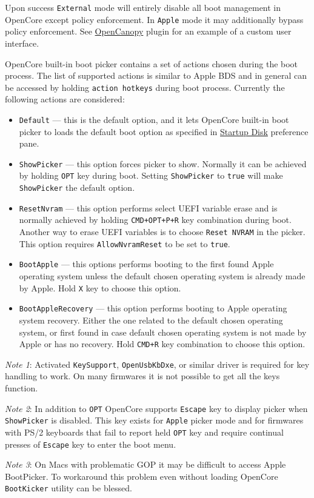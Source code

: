 \documentclass[]{article}
\providecommand{\tightlist}{%
  \setlength{\itemsep}{0pt}\setlength{\parskip}{0pt}}
\begin{document}
\begin{enumerate}
  Upon success \texttt{External} mode will entirely disable all boot management
  in OpenCore except policy enforcement. In \texttt{Apple} mode it may additionally
  bypass policy enforcement. See \hyperref[ueficanopy]{OpenCanopy} plugin
  for an example of a custom user interface.

  OpenCore built-in boot picker contains a set of actions chosen during the boot process.
  The list of supported actions is similar to Apple BDS and in general can be accessed by
  holding \texttt{action hotkeys} during boot process. Currently the following actions are
  considered:

  \begin{itemize}
  \tightlist
  \item \texttt{Default} --- this is the default option, and it lets OpenCore built-in
  boot picker to loads the default boot option as specified in
  \href{https://support.apple.com/HT202796}{Startup Disk} preference pane.
  \item \texttt{ShowPicker} --- this option forces picker to show. Normally it can be
  achieved by holding \texttt{OPT} key during boot. Setting \texttt{ShowPicker} to
  \texttt{true} will make \texttt{ShowPicker} the default option.
  \item \texttt{ResetNvram} --- this option performs select UEFI variable erase and is
  normally achieved by holding \texttt{CMD+OPT+P+R} key combination during boot.
  Another way to erase UEFI variables is to choose \texttt{Reset NVRAM} in the picker.
  This option requires \texttt{AllowNvramReset} to be set to \texttt{true}.
  \item \texttt{BootApple} --- this options performs booting to the first found Apple
  operating system unless the default chosen operating system is already made by Apple.
  Hold \texttt{X} key to choose this option.
  \item \texttt{BootAppleRecovery} --- this option performs booting to Apple operating
  system recovery. Either the one related to the default chosen operating system,
  or first found in case default chosen operating system is not made by Apple or has no
  recovery. Hold \texttt{CMD+R} key combination to choose this option.
  \end{itemize}

  \emph{Note 1}: Activated \texttt{KeySupport}, \texttt{OpenUsbKbDxe}, or similar driver is required
  for key handling to work. On many firmwares it is not possible to get all the keys function.

  \emph{Note 2}: In addition to \texttt{OPT} OpenCore supports \texttt{Escape} key to display picker when
  \texttt{ShowPicker} is disabled. This key exists for \texttt{Apple} picker mode and for
  firmwares with PS/2 keyboards that fail to report held \texttt{OPT} key and require continual
  presses of \texttt{Escape} key to enter the boot menu.

  \emph{Note 3}: On Macs with problematic GOP it may be difficult to access Apple BootPicker.
  To workaround this problem even without loading OpenCore \texttt{BootKicker} utility can be blessed.

\end{enumerate}
\end{document}
